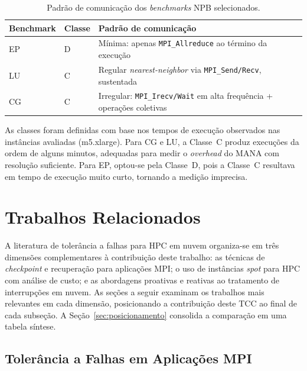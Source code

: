 \begin{table}[htb]
  \caption{Padrão de comunicação dos \textit{benchmarks} NPB selecionados.}
  \label{tab:npb-benchmarks}
  \begin{tabular}{l l p{9.5cm}}
    \toprule
    \textbf{Benchmark} & \textbf{Classe} & \textbf{Padrão de comunicação} \\
    \midrule
    \gls{EP} & D & Mínima: apenas \texttt{MPI\_Allreduce} ao término da execução \\
    \gls{LU} & C & Regular \textit{nearest-neighbor} via \texttt{MPI\_Send/Recv}, sustentada \\
    \gls{CG} & C & Irregular: \texttt{MPI\_Irecv/Wait} em alta frequência + operações coletivas \\
    \bottomrule
  \end{tabular}
\end{table}

As classes foram definidas com base nos tempos de execução observados nas instâncias
avaliadas (m5.xlarge). Para CG e LU, a Classe~C produz execuções da ordem de alguns
minutos, adequadas para medir o \textit{overhead} do MANA com resolução suficiente. Para EP,
optou-se pela Classe~D, pois a Classe~C resultava em tempo de execução muito curto,
tornando a medição imprecisa.


\chapter{Trabalhos Relacionados}
\label{ch:relacionados}

A literatura de tolerância a falhas para HPC em nuvem organiza-se em três
dimensões complementares à contribuição deste trabalho: as técnicas de
\textit{checkpoint} e recuperação para aplicações MPI; o uso de instâncias
\textit{spot} para HPC com análise de custo; e as abordagens proativas e
reativas ao tratamento de interrupções em nuvem. As seções a seguir examinam
os trabalhos mais relevantes em cada dimensão, posicionando a contribuição
deste TCC ao final de cada subseção. A Seção~\ref{sec:posicionamento}
consolida a comparação em uma tabela síntese.

\section{Tolerância a Falhas em Aplicações MPI}
\label{sec:rel-ft-mpi}

